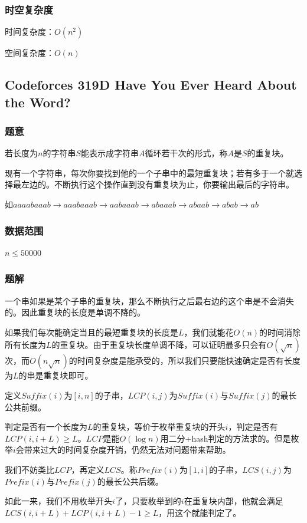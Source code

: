 \documentclass{ctexart}
\begin{document}
\subsubsection{时空复杂度}
时间复杂度：$O(n^2)$

空间复杂度：$O(n)$
\subsection{Codeforces 319D Have You Ever Heard About the Word?}
\subsubsection{题意}
若长度为$n$的字符串$S$能表示成字符串$A$循环若干次的形式，称$A$是$S$的重复块。

现有一个字符串，每次你要找到他的一个子串中的最短重复块；若有多于一个就选择最左边的。不断执行这个操作直到没有重复块为止，你要输出最后的字符串。

如$aaaabaaab \rightarrow aaabaaab \rightarrow aabaaab  \rightarrow abaaab \rightarrow abaab  \rightarrow abab \rightarrow ab$
\subsubsection{数据范围}
$n \le 50000$
\subsubsection{题解}
一个串如果是某个子串的重复块，那么不断执行之后最右边的这个串是不会消失的。因此重复块的长度是单调不降的。

如果我们每次能确定当且的最短重复块的长度是$L$，我们就能花$O(n)$的时间消除所有长度为$L$的重复块。由于重复块长度单调不降，可以证明最多只会有$O(\sqrt{n})$次，而$O(n\sqrt{n})$的时间复杂度是能承受的，所以我们只要能快速确定是否有长度为$L$的串是重复块即可。

定义$Suffix(i)$为$[i,n]$的子串，$LCP(i,j)$为$Suffix(i)$与$Suffix(j)$的最长公共前缀。

判定是否有一个长度为$L$的重复块，等价于枚举重复块的开头$i$，判定是否有$LCP(i,i+L) \ge L$。$LCP$是能$O(\log n)$用二分+hash判定的方法求的。但是枚举$i$会带来过大的时间复杂度开销，仍然无法对问题带来帮助。

我们不妨类比$LCP$，再定义$LCS$。称$Prefix(i)$为$[1,i]$的子串，$LCS(i,j)$为$Prefix(i)$与$Prefix(j)$的最长公共后缀。

如此一来，我们不用枚举开头$i$了，只要枚举到的$i$在重复块内部，他就会满足$LCS(i,i+L)+LCP(i,i+L)-1 \ge L$，用这个就能判定了。
\end{document}
